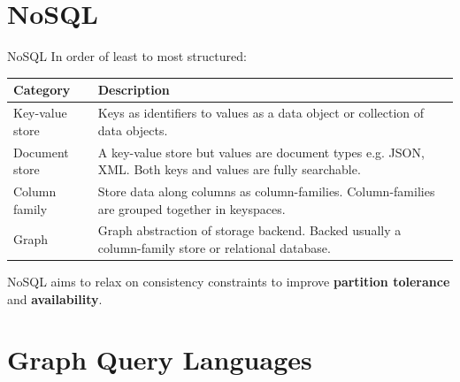 \section{NoSQL}

\begin{frame}{NoSQL}
    In order of least to most structured:
    \vfill
    \begin{tabular}{p{2.4cm}|p{7.5cm}}
        \textbf{Category} & \textbf{Description} \\
        \hline
        \hline
        Key-value store & Keys as identifiers to values as a data object or collection of data objects. \\
        \hline
        Document store & A key-value store but values are document types e.g. JSON, XML. Both keys and values are fully searchable. \\
        \hline
        Column family & Store data along columns as column-families. Column-families are grouped together in keyspaces. \\
        \hline
        Graph & Graph abstraction of storage backend. Backed usually a column-family store or relational database.\\
    \end{tabular}
    \vfill
    NoSQL aims to relax on consistency constraints to improve \textbf{partition tolerance} and \textbf{availability}.
\end{frame}

\section{Graph Query Languages}

